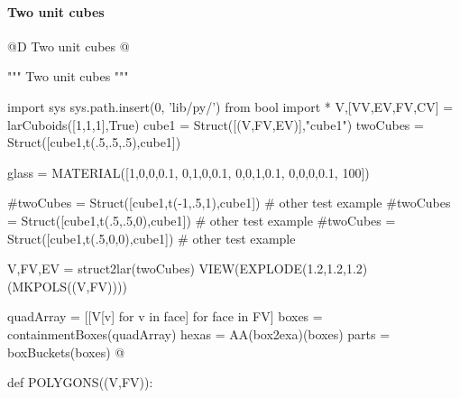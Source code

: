 \documentclass[11pt,oneside]{article}    %
\begin{document}
\paragraph{Two unit cubes}
@D Two unit cubes 
@{""" Two unit cubes """

import sys
sys.path.insert(0, 'lib/py/')
from bool import *
V,[VV,EV,FV,CV] = larCuboids([1,1,1],True)
cube1 = Struct([(V,FV,EV)],"cube1")
twoCubes = Struct([cube1,t(.5,.5,.5),cube1])

glass = MATERIAL([1,0,0,0.1,  0,1,0,0.1,  0,0,1,0.1, 0,0,0,0.1, 100])

#twoCubes = Struct([cube1,t(-1,.5,1),cube1])     # other test example
#twoCubes = Struct([cube1,t(.5,.5,0),cube1])    # other test example
#twoCubes = Struct([cube1,t(.5,0,0),cube1])        # other test example

V,FV,EV = struct2lar(twoCubes)
VIEW(EXPLODE(1.2,1.2,1.2)(MKPOLS((V,FV))))

quadArray = [[V[v] for v in face] for face in FV]
boxes = containmentBoxes(quadArray)
hexas = AA(box2exa)(boxes)
parts = boxBuckets(boxes)
@}


def POLYGONS((V,FV)):
\end{document}
